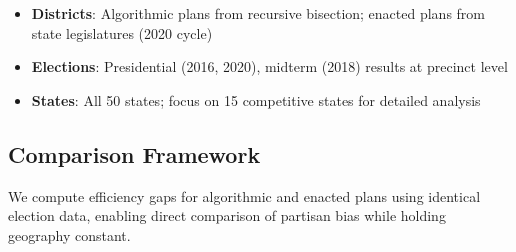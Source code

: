 \begin{itemize}
\item \textbf{Districts}: Algorithmic plans from recursive bisection; enacted plans from state legislatures (2020 cycle)
\item \textbf{Elections}: Presidential (2016, 2020), midterm (2018) results at precinct level
\item \textbf{States}: All 50 states; focus on 15 competitive states for detailed analysis
\end{itemize}

\subsection{Comparison Framework}

We compute efficiency gaps for algorithmic and enacted plans using identical election data, enabling direct comparison of partisan bias while holding geography constant.
